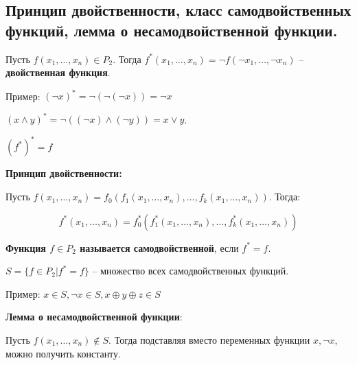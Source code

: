 \subsection{Принцип двойственности, класс самодвойственных функций, лемма о несамодвойственной функции.}

   Пусть $f(x_1, \ldots, x_n) \in P_2$. Тогда $f^*(x_1, \ldots, x_n) = \neg f(\neg x_1, \ldots, \neg x_n)$ -- \textbf{двойственная функция}.

   Пример: $(\neg x)^* = \neg(\neg(\neg x)) = \neg x$

   $(x \wedge y)^* = \neg((\neg x) \wedge (\neg y)) = x \vee y$.

   $(f^*)^* = f$

\textbf{Принцип двойственности:}  

   Пусть $f(x_1,\ldots,x_n) = f_0(f_1(x_1,\ldots,x_n),\ldots,f_k(x_1,\ldots,x_n))$. Тогда:

   $$f^*(x_1,\ldots,x_n) = f_0^*(f_1^*(x_1,\ldots,x_n),\ldots,f_k^*(x_1,\ldots,x_n))$$

 \textbf{Функция $f \in P_2$ называется самодвойственной}, если $f^* = f$.

  $S = \{f \in P_2 | f^* = f\}$ -- множество всех самодвойственных функций.

  Пример: $x \in S, \neg x \in S, x \oplus y \oplus z \in S$

  \textbf{Лемма о несамодвойственной функции}:

   Пусть $f(x_1, \ldots, x_n) \notin S$. Тогда подставляя вместо переменных функции $x, \neg x$, можно получить константу.
